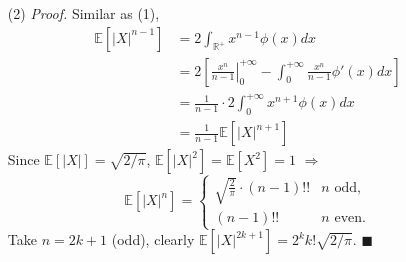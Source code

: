 \documentclass[a4paper,12pt,twoside]{book}
\begin{document}
\begin{itemize}
	\item[(2)]\textit{Proof.} Similar as (1),
	\begin{equation}
		\begin{split}
			\mathbb{E}\left[|X|^{n-1}\right]&=2\int_{\mathbb{R^+}}x^{n-1}\phi(x)dx\\
			&=2\left[\left.\frac{x^n}{n-1}\right\vert_{0}^{+\infty}-\int_{0}^{+\infty}\frac{x^n}{n-1}\phi'(x)dx\right]\\
			&=\frac{1}{n-1}\cdot 2\int_0^{+\infty}x^{n+1}\phi(x)dx\\
			&=\frac{1}{n-1} \mathbb{E}\left[|X|^{n+1}\right]
		\end{split}
	\end{equation}
	Since $\mathbb{E}\left[|X|\right]=\sqrt{2/\pi}$, $\mathbb{E}\left[|X|^2\right]=\mathbb{E}\left[X^2\right]=1$ $\Rightarrow$
	\begin{equation*}
		\mathbb{E}\left[|X|^n\right] = \begin{cases}
		\sqrt{\frac{2}{\pi}}\cdot(n-1)!! &\text{$n$ odd,}\\
		(n-1)!! &\text{$n$ even.}
		\end{cases}
	\end{equation*}
	Take $n=2k+1$ (odd), clearly $\mathbb{E}\left[|X|^{2k+1}\right]=2^kk!\sqrt{2/\pi}$. $\blacksquare$
\end{itemize}
 
\end{document}
